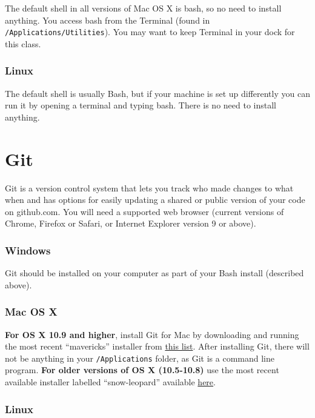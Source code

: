 \documentclass[]{book}
\begin{document}
The default shell in all versions of Mac OS X is bash, so no need to
install anything. You access bash from the Terminal (found in
\texttt{/Applications/Utilities}). You may want to keep Terminal in your
dock for this class.

\subsubsection*{Linux}\label{linux}

The default shell is usually Bash, but if your machine is set up
differently you can run it by opening a terminal and typing bash. There
is no need to install anything.

\section{Git}\label{git}

Git is a version control system that lets you track who made changes to
what when and has options for easily updating a shared or public version
of your code on github.com. You will need a supported web browser
(current versions of Chrome, Firefox or Safari, or Internet Explorer
version 9 or above).

\subsubsection*{Windows}\label{windows-1}

Git should be installed on your computer as part of your Bash install
(described above).

\subsubsection*{Mac OS X}\label{mac-os-x-1}

\textbf{For OS X 10.9 and higher}, install Git for Mac by downloading
and running the most recent ``mavericks'' installer from
\href{http://sourceforge.net/projects/git-osx-installer/files/}{this
list}. After installing Git, there will not be anything in your
\texttt{/Applications} folder, as Git is a command line program.
\textbf{For older versions of OS X (10.5-10.8)} use the most recent
available installer labelled ``snow-leopard'' available
\href{http://sourceforge.net/projects/git-osx-installer/files/}{here}.

\subsubsection*{Linux}\label{linux-1}
\end{document}
